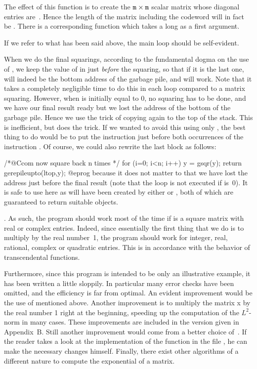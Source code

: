 
\noindent
The effect of this function is to create the ${\tt m}\times{\tt m}$ scalar
matrix whose diagonal entries are~. Hence the length of the matrix
including the codeword will in fact be .  There is a corresponding
function  which takes a long as a first argument.

If we refer to what has been said above, the main loop should be self-evident.

When we do the final squarings, according to the fundamental dogma on the
use of , we keep the value of  in  just 
\emph{before} the squaring, so that if it is the last one,  will
indeed be the bottom address of the garbage pile, and  will
work. Note that it takes a completely negligible time to do this in each loop
compared to a matrix squaring.  However, when  is initially equal to
0, no squaring has to be done, and we have our final result ready but we lost
the address of the bottom of the garbage pile. Hence we use the trick of
copying  again to the top of the stack. This is inefficient, but does
the trick. If we wanted to avoid this using only , the best
thing to do would be to put the instruction  just before both
occurrences of the instruction . Of course, we could also
rewrite the last block as follows:

\bprog
  /*@Ccom now square back n times */
  for (i=0; i<n; i++) y = gsqr(y);
  return gerepileupto(ltop,y);
@eprog
\noindent
because it does not matter to  that we have lost the address
just before the final result (note that the loop is not executed if 
is~0). It is safe to use  here as  will have been
created by either  or , both of which are guaranteed to
return suitable objects.

. As such, the program should work most of the time if
 is a square matrix with real or complex entries. Indeed, since
essentially the first thing that we do is to multiply by the real number~1,
the program should work for integer, real, rational, complex or quadratic
entries. This is in accordance with the behavior of transcendental functions.

Furthermore, since this program is intended to be only an illustrative
example, it has been written a little sloppily. In particular many error
checks have been omitted, and the efficiency is far from optimal. An evident
improvement would be the use of  mentioned above. Another
improvement is to multiply the matrix x by the real number 1 right at the
beginning, speeding up the computation of the $L^2$-norm in many cases. These
improvements are included in the version given in Appendix~B. Still another
improvement would come from a better choice of~. If the reader takes a
look at the implementation of the function  in the file
, he can make the necessary changes himself. Finally,
there exist other algorithms of a different nature to compute the exponential
of a matrix.

